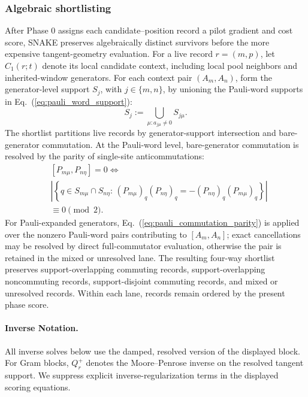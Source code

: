\documentclass[
  reprint,
  amsmath,
  amssymb,
  aps,
  pra,
  nofootinbib,
  superscriptaddress,
  floatfix
]{revtex4-2}
\begin{document}
\subsubsection{Algebraic shortlisting}

After Phase 0 assigns each candidate--position record a pilot gradient and cost score, SNAKE preserves algebraically distinct survivors before the more expensive tangent-geometry evaluation. For a live record $r=(m,p)$, let $C_1(r;t)$ denote its local candidate context, including local pool neighbors and inherited-window generators. For each context pair $(A_m,A_n)$, form the generator-level support $S_j$, with $j\in\{m,n\}$, by unioning the Pauli-word supports in Eq.~(\ref{eq:pauli_word_support}):
\begin{equation}
S_j:=\bigcup_{\mu:a_{j\mu}\ne0}S_{j\mu}.
\label{eq:algebraic_shortlist_checks}
\end{equation}
The shortlist partitions live records by generator-support intersection and bare-generator commutation. At the Pauli-word level, bare-generator commutation is resolved by the parity of single-site anticommutations:
\begin{equation}
\begin{aligned}
&[P_{m\mu},P_{n\eta}]=0 \Longleftrightarrow \\
&\left|
\left\{
q\in S_{m\mu}\cap S_{n\eta}
:\,
(P_{m\mu})_q(P_{n\eta})_q
=-(P_{n\eta})_q(P_{m\mu})_q
\right\}
\right|\\& \equiv0\pmod 2 .
\end{aligned}
\label{eq:pauli_commutation_parity}
\end{equation}
For Pauli-expanded generators, Eq.~(\ref{eq:pauli_commutation_parity}) is applied over the nonzero Pauli-word pairs contributing to $[A_m,A_n]$; exact cancellations may be resolved by direct full-commutator evaluation, otherwise the pair is retained in the mixed or unresolved lane. The resulting four-way shortlist preserves support-overlapping commuting records, support-overlapping noncommuting records, support-disjoint commuting records, and mixed or unresolved records. Within each lane, records remain ordered by the present phase score.

\paragraph*{Inverse Notation.}
All inverse solves below use the damped, resolved version of the displayed block. For Gram blocks, \(Q_r^+\) denotes the Moore--Penrose inverse on the resolved tangent support. We suppress explicit inverse-regularization terms in the displayed scoring equations.
\end{document}

